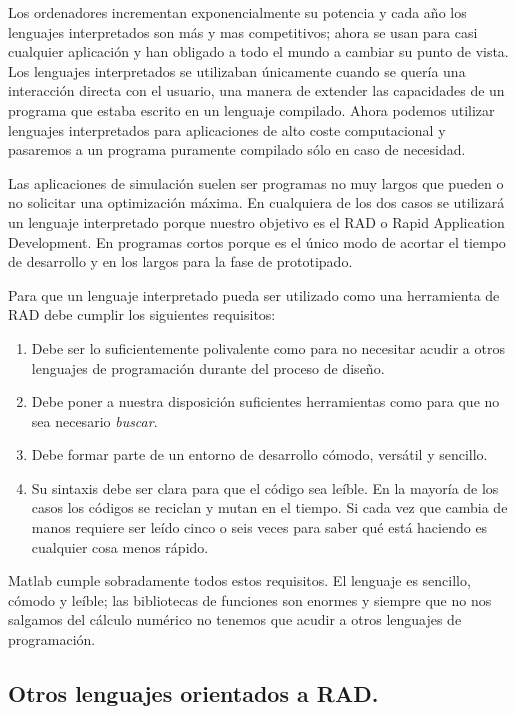 Los ordenadores incrementan exponencialmente su potencia y cada año
los lenguajes interpretados son más y mas competitivos; ahora se usan
para casi cualquier aplicación y han obligado a todo el mundo a
cambiar su punto de vista. Los lenguajes interpretados se utilizaban
únicamente cuando se quería una interacción directa con el usuario,
una manera de extender las capacidades de un programa que estaba
escrito en un lenguaje compilado. Ahora podemos utilizar lenguajes
interpretados para aplicaciones de alto coste computacional y
pasaremos a un programa puramente compilado sólo en caso de necesidad.

Las aplicaciones de simulación suelen ser programas no muy largos que
pueden o no solicitar una optimización máxima. En cualquiera de los
dos casos se utilizará un lenguaje interpretado porque nuestro
objetivo es el RAD o Rapid Application Development. En programas
cortos porque es el único modo de acortar el tiempo de desarrollo y en
los largos para la fase de prototipado.

Para que un lenguaje interpretado pueda ser utilizado como una
herramienta de RAD debe cumplir los siguientes requisitos:

\begin{enumerate}
\item Debe ser lo suficientemente polivalente como para no necesitar acudir
  a otros lenguajes de programación durante del proceso de diseño.
\item Debe poner a nuestra disposición suficientes herramientas como
  para que no sea necesario \emph{buscar}.
\item Debe formar parte de un entorno de desarrollo cómodo, versátil
  y sencillo.
\item Su sintaxis debe ser clara para que el código sea leíble. En la
  mayoría de los casos los códigos se reciclan y mutan en el tiempo.
  Si cada vez que cambia de manos requiere ser leído cinco o seis
  veces para saber qué está haciendo es cualquier cosa menos rápido.
\end{enumerate}
Matlab cumple sobradamente todos estos requisitos. El lenguaje es
sencillo, cómodo y leíble; las bibliotecas de funciones son enormes y
siempre que no nos salgamos del cálculo numérico no tenemos que acudir
a otros lenguajes de programación.


\subsection{Otros lenguajes orientados a RAD.}

